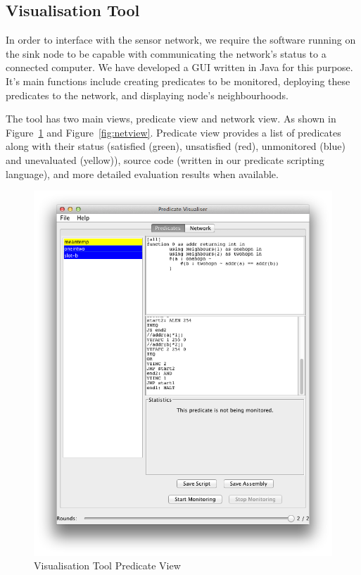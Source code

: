 \subsection{Visualisation Tool}

In order to interface with the sensor network, we require the software running on the sink node to be capable with communicating the network's status to a connected computer. We have developed a GUI written in Java for this purpose. It's main functions include creating predicates to be monitored, deploying these predicates to the network, and displaying node's neighbourhoods.

The tool has two main views, predicate view and network view. As shown in Figure~\ref{fig:predview} and Figure~\ref{fig:netview}. Predicate view provides a list of predicates along with their status (satisfied (green), unsatisfied (red), unmonitored (blue) and unevaluated (yellow)), source code (written in our predicate scripting language), and more detailed evaluation results when available.

\begin{figure}[H]
\centering
\includegraphics[scale=0.5]{Images/gui-predicate-view}
\caption{Visualisation Tool Predicate View}
\label{fig:predview}
\end{figure}

